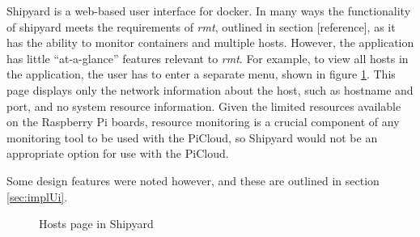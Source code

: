 Shipyard \citep{shipyard} is a web-based user interface for docker.
In many ways the functionality of shipyard meets the requirements of \emph{rmt}, outlined in section [reference], as it has the ability to monitor containers and multiple hosts.
However, the application has little ``at-a-glance'' features relevant to \emph{rmt}.
For example, to view all hosts in the application, the user has to enter a separate menu, shown in figure \ref{fig:shipyardHosts}.
This page displays only the network information about the host, such as hostname and port, and no system resource information.
Given the limited resources available on the Raspberry Pi boards, resource monitoring is a crucial component of any monitoring tool to be used with the PiCloud, so Shipyard would not be an appropriate option for use with the PiCloud.

Some design features were noted however, and these are outlined in section \ref{sec:implUi}.

\begin{figure}[t]
	\centering
	\setlength\fboxsep{0pt}
	\setlength\fboxrule{0.5pt}
	\caption{Hosts page in Shipyard}
	\label{fig:shipyardHosts}
\end{figure}
